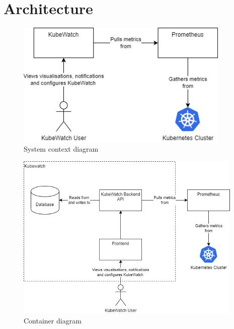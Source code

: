\chapter{Architecture}

    

\begin{figure}[h!]
  \centering
  \caption{\label{fig:system-context-diagram}System context diagram}
  \includegraphics[height=6cm]{resources/System_context_diagram.png} \newline
\end{figure}

\begin{figure}[h!]
  \centering
  \caption{\label{fig:container-diagram}Container diagram}
  \includegraphics[height=8cm]{resources/Container_diagram.png}
\end{figure}

